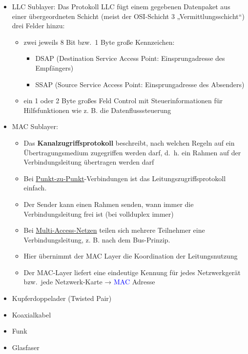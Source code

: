 
\begin{itemize}
    \item LLC Sublayer: Das Protokoll LLC fügt einem gegebenen Datenpaket aus einer übergeordneten Schicht (meist der OSI-Schicht 3 „Vermittlungsschicht“) drei Felder hinzu:
    \begin{itemize}
        \item zwei jeweils 8 Bit bzw.\ 1 Byte große Kennzeichen:
        \begin{itemize}
            \item DSAP (Destination Service Access Point: Einsprungadresse des Empfängers)
            \item SSAP (Source Service Access Point: Einsprungadresse des Absenders)
        \end{itemize}
        \item ein 1 oder 2 Byte großes Feld Control mit Steuerinformationen für Hilfsfunktionen wie z. B. die Datenflusssteuerung
    \end{itemize}
    \item MAC Sublayer:
    \begin{itemize}
        \item Das \textbf{Kanalzugriffsprotokoll} beschreibt, nach welchen Regeln auf ein Übertragungsmedium zugegriffen werden darf,
        d.\ h. ein Rahmen auf der Verbindungsleitung übertragen werden darf
        \item Bei \underline{Punkt-zu-Punkt}-Verbindungen ist das Leitungszugriffsprotokoll einfach.
        \item Der Sender kann einen Rahmen senden, wann immer die Verbindungsleitung frei ist (bei vollduplex immer)
        \item Bei \underline{Multi-Access-Netzen} teilen sich mehrere Teilnehmer eine Verbindungsleitung, z. B. nach dem Bus-Prinzip.
        \item Hier übernimmt der MAC Layer die Koordination der Leitungsnutzung
        \item Der MAC-Layer liefert eine eindeutige Kennung für jedes Netzwerkgerät bzw.\ jede Netzwerk-Karte → \textcolor{blue}{MAC} Adresse
    \end{itemize}
\end{itemize}

\begin{itemize}
    \item Kupferdoppelader (Twisted Pair)
    \item Koaxialkabel
    \item Funk
    \item Glasfaser
\end{itemize}

